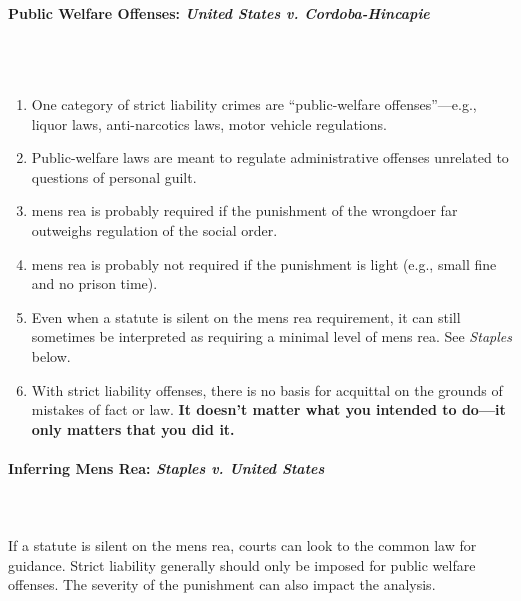 \paragraph{Public Welfare Offenses: \emph{United States v. Cordoba-Hincapie}}
~\\\\
\begin{enumerate}
    \item One category of strict liability crimes are ``public-welfare 
    offenses''---e.g., liquor laws, anti-narcotics laws, motor vehicle 
    regulations.
    \item Public-welfare laws are meant to regulate administrative offenses 
    unrelated to questions of personal guilt.
    \item mens rea is probably required if the punishment of the wrongdoer far 
    outweighs regulation of the social order.
    \item mens rea is probably not required if the punishment is light (e.g., 
    small fine and no prison time).
    \item Even when a statute is silent on the mens rea requirement, it can 
    still sometimes be interpreted as requiring a minimal level of mens rea. 
    See \emph{Staples} below.
    \item With strict liability offenses, there is no basis for acquittal on 
    the grounds of mistakes of fact or law. \textbf{It doesn't matter what you 
    intended to do---it only matters that you did it.}
\end{enumerate}

\paragraph{Inferring Mens Rea: \emph{Staples v. United States}}
~\\\\
If a statute is silent on the mens rea, courts can look to the common law for 
guidance. Strict liability generally should only be imposed for public welfare 
offenses. The severity of the punishment can also impact the analysis.

